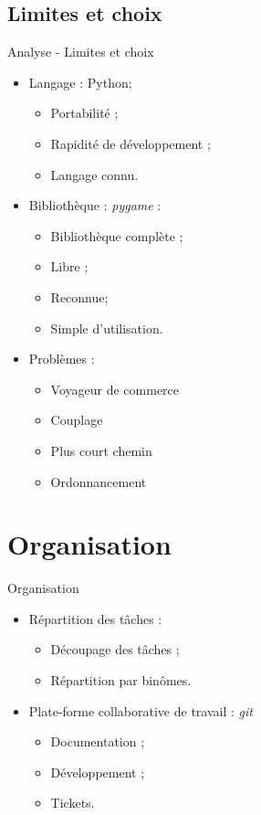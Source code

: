 \documentclass{beamer}
\begin{document}
	\subsection{Limites et choix}
		\begin{frame}{Analyse - Limites et choix}
			\begin{itemize}
				\setlength{\itemsep}{0.3cm}
				\item Langage : Python;
					\begin{itemize}
						\item Portabilité ;
						\item Rapidité de développement ;
						\item Langage connu.
					\end{itemize}
				\item Bibliothèque : \emph{pygame} :
					\begin{itemize}
						\item Bibliothèque complète ;
						\item Libre ;
						\item Reconnue;
						\item Simple d'utilisation.
					\end{itemize}
				\item Problèmes :
					\begin{itemize}
						\item Voyageur de commerce
						\item Couplage
						\item Plus court chemin
						\item Ordonnancement
					\end{itemize}
			\end{itemize}
		\end{frame}
\section{Organisation}
	\begin{frame}{Organisation}
		\begin{itemize}
			\setlength{\itemsep}{0.75cm}
			\item Répartition des tâches :
			\begin{itemize}
			\setlength{\itemsep}{0.3cm}
				\item Découpage des tâches ;
				\item Répartition par binômes.
			\end{itemize}
			\item Plate-forme collaborative de travail : \emph{git}
			\begin{itemize}
			\setlength{\itemsep}{0.3cm}
				\item Documentation ;
				\item Développement ;
				\item Tickets.
			\end{itemize}
		\end{itemize}
	\end{frame}
\end{document}
